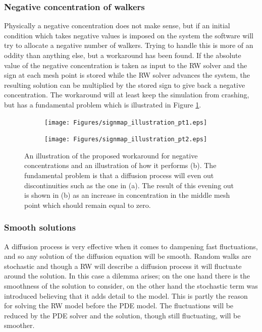  
\subsubsection{Negative concentration of walkers}
Physically a negative concentration does not make sense, but if an initial condition which takes negative values is imposed on the system the software will try to allocate a negative number of walkers. 
Trying to handle this is more of an oddity than anything else, but a workaround has been found. 
If the absolute value of the negative concentration is taken as input to the RW solver and the sign at each mesh point is stored while the RW solver advances the system, the resulting solution can be multiplied by the stored sign to give back a negative concentration. 
The workaround will at least keep the simulation from crashing, but has a fundamental problem which is illustrated in Figure \ref{theory:signmap_illustration}.
  
\begin{figure}[H]
\centering
\begin{subfigure}[t!]{0.48\textwidth}
 \texttt{[image: Figures/signmap\_illustration\_pt1.eps]}
 \caption{}
\end{subfigure}
\begin{subfigure}[t!]{0.48\textwidth}
 \texttt{[image: Figures/signmap\_illustration\_pt2.eps]}
 \caption{}
\end{subfigure}
\caption[Workaround for negative concentrations, illustration]{An illustration of the proposed workaround for negative concentrations and an illustration of how it performs (b). The fundamental problem is that a diffusion process will even out discontinuities such as the one in (a). The result of this evening out is shown in (b) as an increase in concentration in the middle mesh point which should remain equal to zero.}
\label{theory:signmap_illustration}
 \end{figure}

\subsubsection{Smooth solutions}

 A diffusion process is very effective when it comes to dampening fast fluctuations, and so any solution of the diffusion equation will be smooth. 
 Random walks are stochastic and though a RW will describe a diffusion process it will fluctuate around the solution. 
 In this case a dilemma arises; on the one hand there is the smoothness of the solution to consider, on the other hand the stochastic term was introduced believing that it adds detail to the model. 
This is partly the reason for solving the RW model before the PDE model. 
The fluctuations will be reduced by the PDE solver and the solution, though still fluctuating, will be smoother. \\

